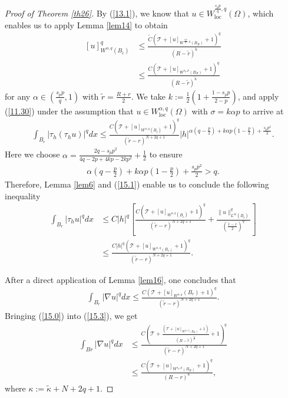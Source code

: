 \documentclass[reqno,10pt]{amsart}
\numberwithin{equation}{section}
\begin{document}
\begin{proof}[Proof of Theorem \ref{th26}]
	By (\ref{13.1}), we know that $u \in W_{\mathrm{loc}}^{\frac{s_p p}{q}, q}(\Omega)$, 
	which enables us to apply Lemma \ref{lem14} to obtain 
	\begin{align}\label{15.0}
		[u]_{W^{\alpha, q}\left(B_{\tilde{r}}\right) }^q & \leq \frac{\widetilde{C}\left(\mathcal{T}+[u]_{W^{\frac{s_p p}{q}, q}\left(B_R\right)}+1\right)^q}{(R-\tilde{r})^{\tilde{\kappa}} } \nonumber\\
		& \leq \frac{C\left(\mathcal{T}+[u]_{W^{s_ p, p}\left(B_R\right)}+1\right)^q}{(R-\tilde{r})^{\tilde{\kappa}}}
	\end{align}
	for any $\alpha\in(\frac{s_pp}{q},1)$ with $\tilde{r}=\frac{R+r}{2}$. We take $k:=\frac{1}{2}\left(1+\frac{1-s_p p}{2-p}\right)$, and apply (\ref{11.30}) under the assumption that $u \in W_{\mathrm{loc}}^{\alpha, q}(\Omega)$
	with $\sigma=k\alpha p$ to arrive at
	\begin{align}\label{15.1}
		\int_{B_r}\left|\tau_h\left(\tau_hu\right)\right|^q d x \leq \frac{C\left(\mathcal{T}+[u]_{W^{\alpha, q}\left(B_{\tilde{r}}\right)}+1\right)^q}{\left(\tilde{r}-r\right)^{N+2q+1}}|h|^{\alpha\left(q-\frac{p}{2}\right)+k\alpha p\left(1-\frac{p}{2}\right)+\frac{s_pp^2}{2}}.
	\end{align}
	Here we choose $\alpha=\frac{2q-s_p p^2}{4q-2p+4kp-2kp^2}+\frac{1}{2}$ to ensure 
	\begin{align*}
		\alpha\left(q-\frac{p}{2}\right)+k\alpha p\left(1-\frac{p}{2}\right)+\frac{s_p p^2}{2}>q .
	\end{align*}
	Therefore, Lemma \ref{lem6} and  (\ref{15.1}) enable us to conclude the following inequality
	\begin{align}\label{15.3}
		\int_{B_r}\left|\tau_h u\right|^q d x & \leq C|h|^q\left[\frac{C\left(\mathcal{T}+[u]_{W^{\alpha, q}(B_{\tilde{r}})}+1\right)^q}{\left(\tilde{r}-r\right)^{N+2q+1}}+\frac{\|u\|_{L^{\infty}\left(B_{\tilde{r}}\right)}^q}{\left(\frac{\tilde{r}-r}{2}\right)^q}\right]\nonumber\\
		& \leq \frac{C|h|^q\left(\mathcal{T}+[u]_{W^{\alpha, q}\left(B_r\right)}+1\right)^q}{(\tilde{r}-r)^{N+2q+1}}.
	\end{align}\par
	After a direct application of Lemma \ref{lem16}, one concludes that
	\begin{align}
		\int_{B_r}|\nabla u|^q d x \leq \frac{C\left(\mathcal{T}+[u]_{W^{\alpha, q}}\left(B_r\right)+1\right)^q}{(\tilde{r}-r)^{N+2q+1}}.
	\end{align}
	Bringing (\ref{15.0}) into (\ref{15.3}), we get 
	\begin{align*}
		\int_{B r}|\nabla u|^q d x&\leq \frac{C\left(\mathcal{T}+\frac{\left(\mathcal{T}+[u]_{W^{s_p,p}\left(B_R\right)}+1\right)}{\left(R-\tilde{r}\right)^{\frac{\tilde{\kappa}}{q}}}+1\right)^q}{\left(\tilde{r}-r\right)^{N+2q+1}}\\
		&\leq \frac{C\left(\mathcal{T}+[u]_{W^{s_p, p}\left(B_R\right)}+1\right)^q}{(R-r)^{\kappa}},
	\end{align*}
	where $\kappa:=\tilde{\kappa}+N+2 q+1$.
\end{proof}
\end{document}
